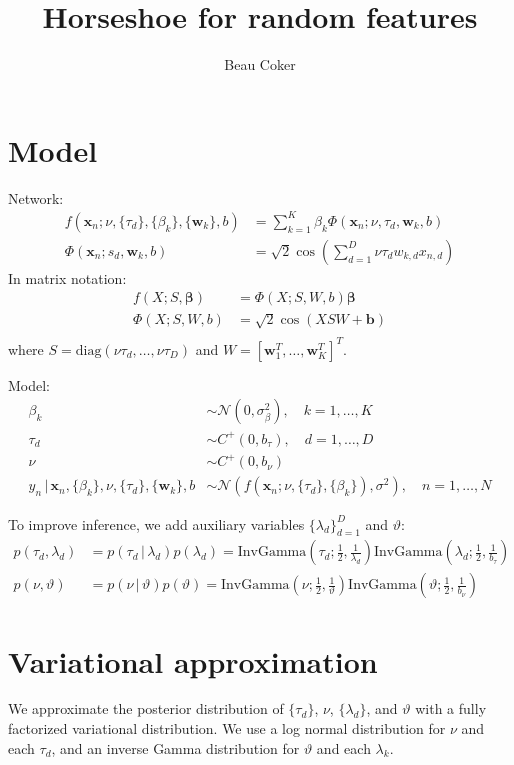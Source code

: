 \documentclass[11pt, oneside]{article}   	%
\title{Horseshoe for random features}
\author{Beau Coker}
\date{}							%
\def \bbeta {\bm{\beta}}
\def \x {\mathbf{x}}
\def \w {\mathbf{w}}
\def \b {\mathbf{b}}
\newcommand{\given}{\,|\,}
\begin{document}
\maketitle


\section{Model}

Network:
\begin{align}
f(\x_n; \nu, \{\tau_d\}, \{\beta_k\}, \{\w_k\}, b ) &=\sum_{k=1}^K \beta_k \Phi(\x_n; \nu, \tau_d, \w_k, b ) \\
\Phi(\x_n; s_d, \w_k, b) &= \sqrt{2}\cos\left(  \sum_{d=1}^D \nu \tau_d w_{k,d} x_{n,d} \right)
\end{align}
In matrix notation:
\begin{align}
f(X; S, \bbeta) &= \Phi(X; S, W, b)\bbeta \\
\Phi(X; S, W, b) &= \sqrt{2}\cos(X S W + \b) \\
\end{align}
where $S=\text{diag}(\nu \tau_d,\dotsc,\nu \tau_D)$ and $W=[\w_1^T,\dotsc,\w_K^T]^T$.

Model:
\begin{align}
\beta_k &\sim \mathcal{N}(0, \sigma^2_\beta), \quad k=1,\dotsc,K \\
\tau_d &\sim C^+(0, b_\tau), \quad d=1,\dotsc,D \\
\nu &\sim C^+(0, b_\nu) \\
y_n \given \x_n, \{\beta_k\}, \nu, \{\tau_d\}, \{\w_k\}, b &\sim \mathcal{N}(f(\x_n; \nu, \{\tau_d\}, \{\beta_k\}), \sigma^2), \quad n=1,\dotsc,N 
\end{align}

To improve inference, we add auxiliary variables $\{ \lambda_d \}_{d=1}^D$ and $\vartheta$:
\begin{align}
p(\tau_d, \lambda_d) &= p(\tau_d \given \lambda_d) p(\lambda_d)= \text{InvGamma}\left(\tau_d;  \frac{1}{2}, \frac{1}{\lambda_d}\right)  \text{InvGamma}\left(\lambda_d; \frac{1}{2}, \frac{1}{b_\tau}\right)
\\
p(\nu, \vartheta) &= p(\nu \given \vartheta) p(\vartheta) = \text{InvGamma}\left(\nu;  \frac{1}{2}, \frac{1}{\vartheta}\right)  \text{InvGamma}\left(\vartheta; \frac{1}{2}, \frac{1}{b_\nu}\right)
\end{align}

\section{Variational approximation}
We approximate the posterior distribution of $\{\tau_d\}$, $\nu$, $\{\lambda_d\}$, and $\vartheta$ with a fully factorized variational distribution. We use a log normal distribution for $\nu$ and each $\tau_d$, and an inverse Gamma distribution for $\vartheta$ and each $\lambda_k$.
\end{document}
